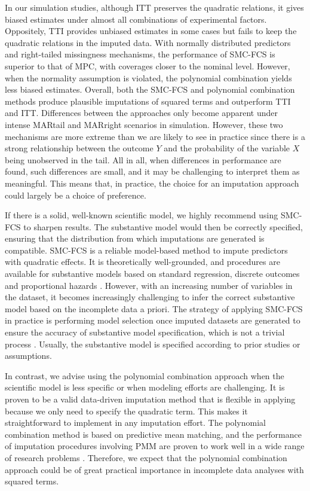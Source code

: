	
	In our simulation studies, although ITT preserves the quadratic relations, it gives biased estimates under almost all combinations of experimental factors. Oppositely, TTI provides unbiased estimates in some cases but fails to keep the quadratic relations in the imputed data. With normally distributed predictors and right-tailed missingness mechanisms, the performance of SMC-FCS is superior to that of MPC, with coverages closer to the nominal level. However, when the normality assumption is violated, the polynomial combination yields less biased estimates. Overall, both the SMC-FCS and polynomial combination methods produce plausible imputations of squared terms and outperform TTI and ITT. Differences between the approaches only become apparent under intense MARtail and MARright scenarios in simulation. However, these two mechanisms are more extreme than we are likely to see in practice since there is a strong relationship between the outcome $Y$ and the probability of the variable $X$ being unobserved in the tail. All in all, when differences in performance are found, such differences are small, and it may be challenging to interpret them as meaningful. This means that, in practice, the choice for an imputation approach could largely be a choice of preference. 
	
	If there is a solid, well-known scientific model, we highly recommend using SMC-FCS to sharpen results. The substantive model would then be correctly specified, ensuring that the distribution from which imputations are generated is compatible. SMC-FCS is a reliable model-based method to impute predictors with quadratic effects. It is theoretically well-grounded, and procedures are available for substantive models based on standard regression, discrete outcomes and proportional hazards \citep{Buuren2018}. However, with an increasing number of variables in the dataset, it becomes increasingly challenging to infer the correct substantive model based on the incomplete data a priori. The strategy of applying SMC-FCS in practice is performing model selection once imputed datasets are generated to ensure the accuracy of substantive model specification, which is not a trivial process \citep{bartlett2015multiple}. Usually, the substantive model is specified according to prior studies or assumptions.      
	
	In contrast, we advise using the polynomial combination approach when the scientific model is less specific or when modeling efforts are challenging. It is proven to be a valid data-driven imputation method that is flexible in applying because we only need to specify the quadratic term. This makes it straightforward to implement in any imputation effort. The polynomial combination method is based on predictive mean matching, and the performance of imputation procedures involving PMM are proven to work well in a wide range of research problems \citep{Vink2015, rubin1986statistical, little1988missing}. Therefore, we expect that the polynomial combination approach could be of great practical importance in incomplete data analyses with squared terms.  
	
